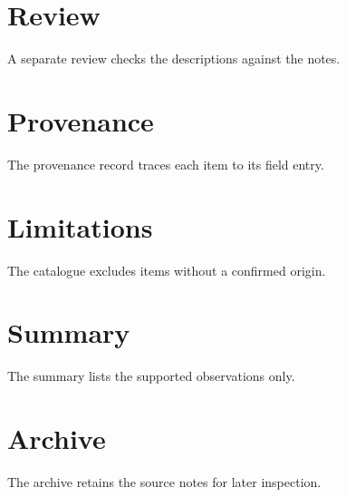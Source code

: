 \documentclass{article}
\begin{document}
\section{Review}
A separate review checks the descriptions against the notes.
\section{Provenance}
The provenance record traces each item to its field entry.
\section{Limitations}
The catalogue excludes items without a confirmed origin.
\section{Summary}
The summary lists the supported observations only.
\section{Archive}
The archive retains the source notes for later inspection.
\end{document}

